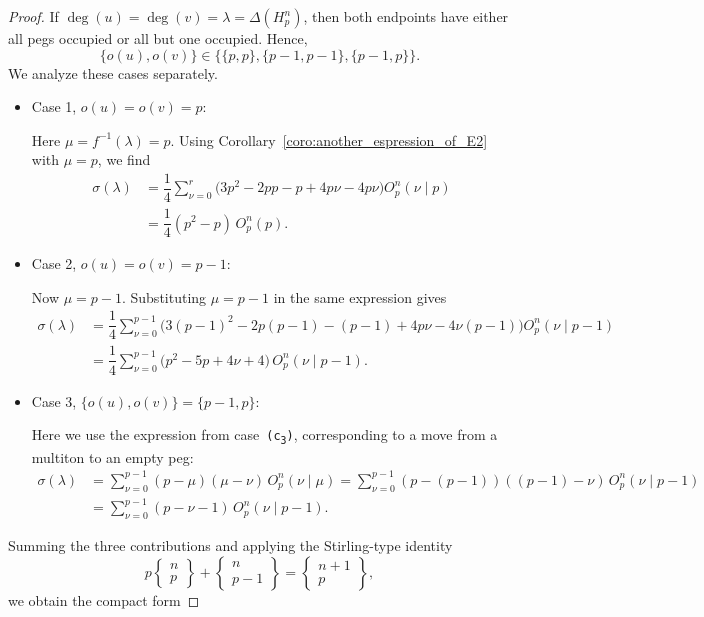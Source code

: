 \documentclass[letterpaper,12pt]{article}
\begin{document}
\begin{proof}
If $\deg(u)=\deg(v)=\lambda=\Delta(H_p^n)$, then both endpoints have either all pegs occupied or all but one occupied. Hence,
\[
\{o(u),o(v)\}\in\bigl\{\{p,p\},\{p-1,p-1\},\{p-1,p\}\bigr\}.
\]
We analyze these cases separately.


\noindent
\begin{itemize}
    \item Case 1, $o(u)=o(v)=p$:

Here $\mu=f^{-1}(\lambda)=p$.  
Using Corollary~\ref{coro:another_espression_of_E2} with $\mu=p$, we find
\begin{align*}
\sigma(\lambda)
&= \dfrac{1}{4}   \sum_{\nu = 0}^{r} 
   \bigl(3p^{2} -2pp -p + 4p\nu -4p\nu\bigr) O_p^n(\nu \mid p)\\
&= \dfrac{1}{4}  (p^{2}-p)\,O_p^n(p).
\end{align*}

\item Case 2, $o(u)=o(v)=p-1$: 

Now $\mu=p-1$. Substituting $\mu=p-1$ in the same expression gives
\begin{align*}
\sigma(\lambda)
&= \dfrac{1}{4}   \sum_{\nu = 0}^{p-1} 
   \bigl(3(p-1)^2 -2p(p-1)-(p-1)+4p\nu-4\nu(p-1)\bigr)
   O_p^n(\nu \mid p-1)\\
&= \dfrac{1}{4}   \sum_{\nu = 0}^{p-1} 
   \bigl(p^{2}-5p+4\nu+4\bigr)\,O_p^n(\nu \mid p-1).
\end{align*}

\item  Case 3,  $\{o(u),o(v)\}=\{p-1,p\}$:

Here we use the expression from case~\texttt{(c\textsubscript{3})}, corresponding to a move from a multiton to an empty peg:
\begin{align*}
\sigma(\lambda)
&= \sum_{\nu = 0}^{p-1}(p-\mu)(\mu-\nu)\,O_p^n(\nu \mid \mu)
 = \sum_{\nu = 0}^{p-1}(p-(p-1))((p-1)-\nu)\,O_p^n(\nu \mid p-1)\\
&= \sum_{\nu = 0}^{p-1}(p-\nu-1)\,O_p^n(\nu \mid p-1).
\end{align*}
\end{itemize}
 
Summing the three contributions and applying the Stirling-type identity
\[
p\begin{Bmatrix} n\\p \end{Bmatrix}
   + \begin{Bmatrix} n\\p-1 \end{Bmatrix}
   = \begin{Bmatrix} n+1\\p \end{Bmatrix},
\]
we obtain the compact form


\end{proof}
\end{document}
